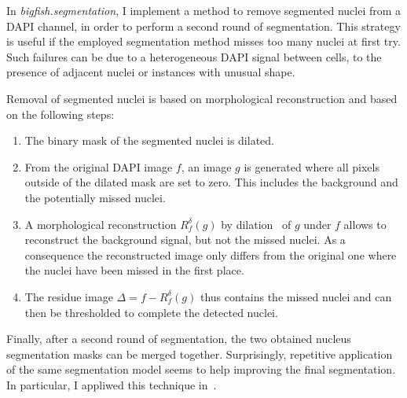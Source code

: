 In \emph{bigfish.segmentation}, I implement a method to remove segmented nuclei from a DAPI channel, in order to perform a second round of segmentation.
This strategy is useful if the employed segmentation method misses too many nuclei at first try. 
Such failures can be due to a heterogeneous DAPI signal between cells, to the presence of adjacent nuclei or instances with unusual shape. 

Removal of segmented nuclei is based on morphological reconstruction and based on the following steps:
\begin{enumerate}
	\setlength\itemsep{0.1em}
	\item The binary mask of the segmented nuclei is dilated.
	\item From the original DAPI image $f$, an image $g$ is generated where all pixels outside of the dilated mask are set to zero. This includes the background and the potentially missed nuclei. 
	\item A morphological reconstruction $R^{\delta}_f(g)$ by dilation~\cite{Serra1983, Soille2003, Robinson_2004} of $g$ under $f$ allows to reconstruct the background signal, but not the missed nuclei. As a consequence
	the reconstructed image only differs from the original one where the nuclei have been missed in the first place.
	\item The residue image $\Delta = f - R^{\delta}_f(g)$ thus contains the missed nuclei and can then be thresholded to complete the detected nuclei. 
\end{enumerate}

\noindent
Finally, after a second round of segmentation, the two obtained nucleus segmentation masks can be merged together.
Surprisingly, repetitive application of the same segmentation model seems to help improving the final segmentation.
In particular, I appliwed this technique in~\cite{CHOUAIB_2020}.\\

